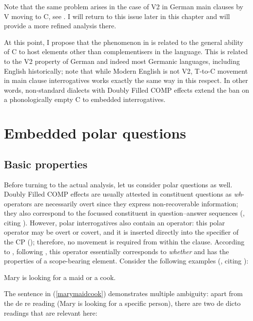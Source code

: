 Note that the same problem arises in the case of V2 in German main clauses by V moving to C, see \citet[10--32]{fanselow2004}. I will return to this issue later in this chapter and will provide a more refined analysis there.

At this point, I propose that the phenomenon in  is related to the general ability of C to host elements other than complementisers in the language. This is related to the V2 property of German and indeed most Germanic languages, including English historically; note that while Modern English is not V2, T-to-C movement in main clause interrogatives works exactly the same way in this respect. In other words, non-standard dialects with Doubly Filled COMP effects extend the ban on a phonologically empty C to embedded interrogatives.

\section{Embedded polar questions} \label{sec:3embeddedpolar}
\subsection{Basic properties} \label{sec:3basic}\largerpage

Before turning to the actual analysis, let us consider polar questions as well. Doubly Filled COMP effects are usually attested in constituent questions as \textit{wh}-operators are necessarily overt since they express non-recoverable information; they also correspond to the focussed constituent in question--answer sequences (\citealt[250]{krifka2008}, citing \citealt{paul1880}). However, polar interrogatives also contain an operator: this polar operator may be overt or covert, and it is inserted directly into the specifier of the CP (\citealt{bianchicruschina2016}); therefore, no movement is required from within the clause. According to \citet{larson1985nllt}, following \citet{roothpartee1982}, this operator essentially corresponds to \textit{whether} and has the properties of a scope-bearing element. Consider the following examples (\citealt[218, ex. 1]{larson1985nllt}, citing \citealt{roothpartee1982}):

\ea Mary is looking for a maid or a cook. \label{marymaidcook}
\z

The sentence in (\ref{marymaidcook}) demonstrates multiple ambiguity: apart from the de re reading (Mary is looking for a specific person), there are two de dicto readings that are relevant here:

